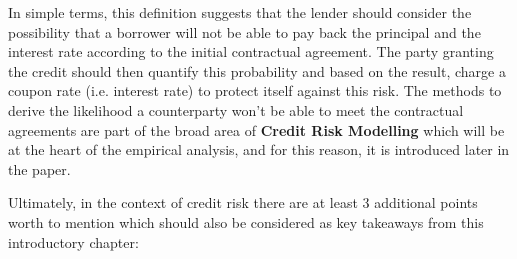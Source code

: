 \documentclass[a4paper,12pt]{article}
\begin{document}
    In simple terms, this definition suggests that the lender should consider the possibility that a borrower 
    will not be able to pay back the principal and the interest rate according to the initial contractual agreement. 
    The party granting the credit should then quantify this probability and based on the result, 
    charge a coupon rate (i.e. interest rate) to protect itself against this risk. 
    The methods to derive the likelihood a counterparty won't be able to meet the contractual agreements are 
    part of the broad area of \textbf{Credit Risk Modelling} \cite{bluhm2016introduction} 
    which will be at the heart of the empirical analysis, and for this reason, it is introduced later in the paper. 
        
    Ultimately, in the context of credit risk there are at least 3 additional points \cite{investopediacreditrisk} 
    worth to mention which should also be considered as key takeaways from this introductory chapter:  
           
\end{document}

